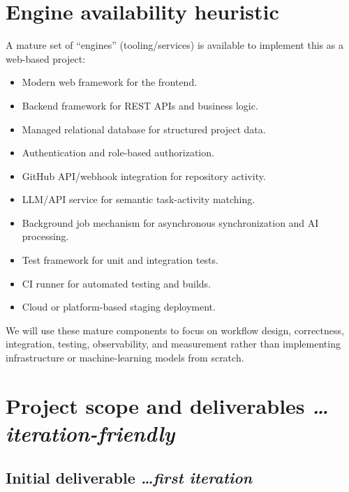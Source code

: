 \documentclass[11pt,a4paper]{article}
\newcommand{\BvrHint}[1]{%
  \texorpdfstring{%
    {\normalfont\normalsize\itshape\hfill #1}%
  }{}%
}
\begin{document}
\section{Engine availability heuristic}

A mature set of ``engines'' (tooling/services) is available to implement this as a web-based project:

\begin{itemize}[leftmargin=0.7cm]

    \item Modern web framework for the frontend.

    \item Backend framework for REST APIs and business logic.

    \item Managed relational database for structured project data.

    \item Authentication and role-based authorization.

    \item GitHub API/webhook integration for repository activity.

    \item LLM/API service for semantic task-activity matching.

    \item Background job mechanism for asynchronous synchronization and AI processing.

    \item Test framework for unit and integration tests.

    \item CI runner for automated testing and builds.

    \item Cloud or platform-based staging deployment.

\end{itemize}

We will use these mature components to focus on workflow design, correctness, integration, testing, observability, and measurement rather than implementing infrastructure or machine-learning models from scratch.


\section{Project scope and deliverables%
  \BvrHint{\ldots iteration-friendly}}

\subsection{Initial deliverable%
  \BvrHint{\ldots first iteration}}
\end{document}
